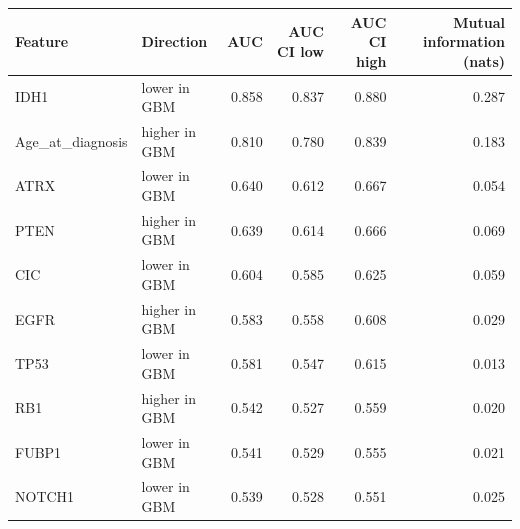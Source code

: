 \begin{tabular}{llrrrr}
\toprule
\textbf{Feature} & \textbf{Direction} & \textbf{AUC} & \textbf{AUC CI low} & \textbf{AUC CI high} & \textbf{Mutual information (nats)} \\
\midrule
IDH1 & lower in GBM & 0.858 & 0.837 & 0.880 & 0.287 \\
Age\_at\_diagnosis & higher in GBM & 0.810 & 0.780 & 0.839 & 0.183 \\
ATRX & lower in GBM & 0.640 & 0.612 & 0.667 & 0.054 \\
PTEN & higher in GBM & 0.639 & 0.614 & 0.666 & 0.069 \\
CIC & lower in GBM & 0.604 & 0.585 & 0.625 & 0.059 \\
EGFR & higher in GBM & 0.583 & 0.558 & 0.608 & 0.029 \\
TP53 & lower in GBM & 0.581 & 0.547 & 0.615 & 0.013 \\
RB1 & higher in GBM & 0.542 & 0.527 & 0.559 & 0.020 \\
FUBP1 & lower in GBM & 0.541 & 0.529 & 0.555 & 0.021 \\
NOTCH1 & lower in GBM & 0.539 & 0.528 & 0.551 & 0.025 \\
\bottomrule
\end{tabular}
